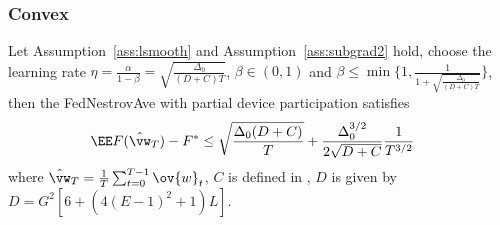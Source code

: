 \subsubsection{Convex}
\begin{theorem}
	Let Assumption~\ref{ass:lsmooth} and Assumption~\ref{ass:subgrad2} hold,  choose the learning rate $\eta = \frac{\alpha}{1 - \beta} = \sqrt{\frac{\Delta_0}{(D+C)T}}$, $\beta \in (0, 1)$ and $\beta \leq \min\{1, \frac{1}{1 + \sqrt{\frac{\Delta_0}{(D+C)T}}}\}$, then the FedNestrovAve with partial device participation satisfies
	\begin{align}
		 \EE F(\hat{\vw}_T) - F^* &\leq \sqrt{\frac{\Delta_0(D + C)}{T}} + \frac{\Delta_0^{3/2}}{2\sqrt{D+C}}\frac{1}{T^{3/2}} 
	\end{align}
	where $\hat{\vw}_T = \frac{1}{T}\sum_{t=0}^{T-1} \ov{w}_t$, $C$ is defined in \eq{\ref{eq:partialsample}},
$D$ is given by $D =  G^2[6 + (4(E-1)^2+1)L]$.
\end{theorem}

